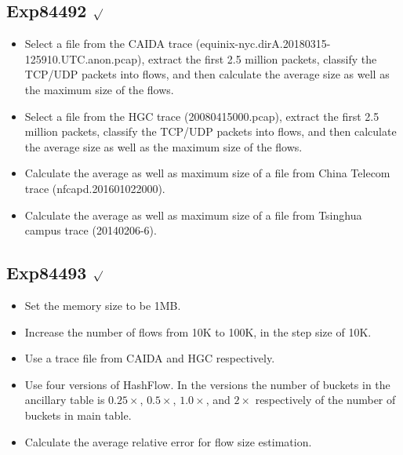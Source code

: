 \documentclass{article}
\begin{document}
\subsection{Exp84492 $\surd$}
\begin{itemize}
	\item Select a file from the CAIDA trace (equinix-nyc.dirA.20180315-125910.UTC.anon.pcap), extract the first 2.5 million packets, classify the TCP/UDP packets into flows, and then calculate the average size as well as the maximum size of the flows.
	\item Select a file from the HGC trace (20080415000.pcap), extract the first 2.5 million packets, classify the TCP/UDP packets into flows, and then calculate the average size as well as the maximum size of the flows.
	\item Calculate the average as well as maximum size of a file from China Telecom trace (nfcapd.201601022000).
	\item Calculate the average as well as maximum size of a file from Tsinghua campus trace (20140206-6). 
\end{itemize}

\subsection{Exp84493 $\surd$}
\begin{itemize}
	\item Set the memory size to be 1MB. 
	\item Increase the number of flows from 10K to 100K, in the step size of 10K.
	\item Use a trace file from CAIDA and HGC respectively.
	\item Use four versions of HashFlow. In the versions the number of buckets in the ancillary table is $0.25\times$, $0.5\times$, $1.0\times$, and $2\times$ respectively of the number of buckets in main table.
	\item Calculate the average relative error for flow size estimation.
\end{itemize}
\end{document}
